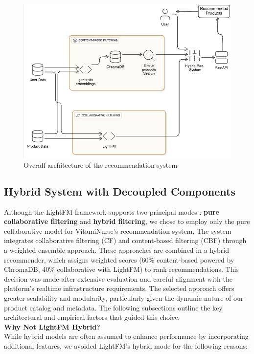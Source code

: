 \begin{figure}[H]
\centering
\includegraphics[scale=0.55]{images/RS_Arch.png}
\caption{Overall architecture of the recommendation system}
\label{fig:Recommendation_Sequence_Diagram}
\end{figure}

\subsection{Hybrid System with Decoupled Components}
Although the LightFM framework supports two principal modes : \textbf{pure
collaborative filtering} and \textbf{hybrid filtering}, we chose to employ only
the pure collaborative model for VitamiNurse’s recommendation system.
The system integrates collaborative filtering (CF) and content-based
filtering (CBF) through a weighted ensemble approach. These approaches
are combined in a hybrid recommender, which assigns weighted scores
(60\% content-based powered by ChromaDB, 40\% collaborative with
LightFM) to rank recommendations. This decision was made after
extensive evaluation and careful alignment with the platform’s realtime infrastructure requirements. The selected approach offers greater
scalability and modularity, particularly given the dynamic nature of our
product catalog and metadata. The following subsections outline the key
architectural and empirical factors that guided this choice.
\\
\textbf{Why Not LightFM Hybrid?}
\\
While hybrid models are often assumed to enhance performance by
incorporating additional features, we avoided LightFM’s hybrid mode for
the following reasons:

